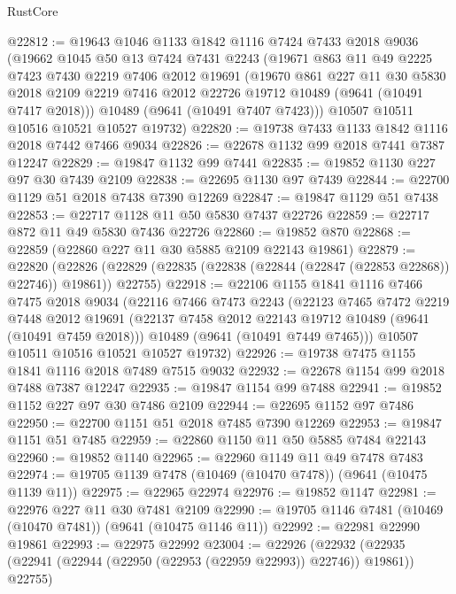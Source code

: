 \begin{lexlean}{RustCore}
\begin{coremodule}
@22812 := @19643
    @1046
    @1133
    @1842
    @1116
    @7424
    @7433
    @2018
    @9036
    (@19662
      @1045
      @50
      @13
      @7424
      @7431
      @2243
      (@19671
        @863
        @11
        @49
        @2225
        @7423
        @7430
        @2219
        @7406
        @2012
        @19691
        (@19670
          @861
          @227
          @11
          @30
          @5830
          @2018
          @2109
          @2219
          @7416
          @2012
          @22726
          @19712
          @10489
          (@9641 (@10491 @7417 @2018)))
        @10489
        (@9641 (@10491 @7407 @7423)))
      @10507
      @10511
      @10516
      @10521
      @10527
      @19732)
@22820 := @19738 @7433 @1133 @1842 @1116 @2018 @7442 @7466 @9034
@22826 := @22678 @1132 @99 @2018 @7441 @7387 @12247
@22829 := @19847 @1132 @99 @7441
@22835 := @19852 @1130 @227 @97 @30 @7439 @2109
@22838 := @22695 @1130 @97 @7439
@22844 := @22700 @1129 @51 @2018 @7438 @7390 @12269
@22847 := @19847 @1129 @51 @7438
@22853 := @22717 @1128 @11 @50 @5830 @7437 @22726
@22859 := @22717 @872 @11 @49 @5830 @7436 @22726
@22860 := @19852 @870
@22868 := @22859 (@22860 @227 @11 @30 @5885 @2109 @22143 @19861)
@22879 := @22820
    (@22826 (@22829 (@22835 (@22838 (@22844 (@22847 (@22853 @22868)) @22746)) @19861)) @22755)
@22918 := @22106
    @1155
    @1841
    @1116
    @7466
    @7475
    @2018
    @9034
    (@22116
      @7466
      @7473
      @2243
      (@22123
        @7465
        @7472
        @2219
        @7448
        @2012
        @19691
        (@22137 @7458 @2012 @22143 @19712 @10489 (@9641 (@10491 @7459 @2018)))
        @10489
        (@9641 (@10491 @7449 @7465)))
      @10507
      @10511
      @10516
      @10521
      @10527
      @19732)
@22926 := @19738 @7475 @1155 @1841 @1116 @2018 @7489 @7515 @9032
@22932 := @22678 @1154 @99 @2018 @7488 @7387 @12247
@22935 := @19847 @1154 @99 @7488
@22941 := @19852 @1152 @227 @97 @30 @7486 @2109
@22944 := @22695 @1152 @97 @7486
@22950 := @22700 @1151 @51 @2018 @7485 @7390 @12269
@22953 := @19847 @1151 @51 @7485
@22959 := @22860 @1150 @11 @50 @5885 @7484 @22143
@22960 := @19852 @1140
@22965 := @22960 @1149 @11 @49 @7478 @7483
@22974 := @19705 @1139 @7478 (@10469 (@10470 @7478)) (@9641 (@10475 @1139 @11))
@22975 := @22965 @22974
@22976 := @19852 @1147
@22981 := @22976 @227 @11 @30 @7481 @2109
@22990 := @19705 @1146 @7481 (@10469 (@10470 @7481)) (@9641 (@10475 @1146 @11))
@22992 := @22981 @22990 @19861
@22993 := @22975 @22992
@23004 := @22926
    (@22932 (@22935 (@22941 (@22944 (@22950 (@22953 (@22959 @22993)) @22746)) @19861)) @22755)

\end{coremodule}
\end{lexlean}
